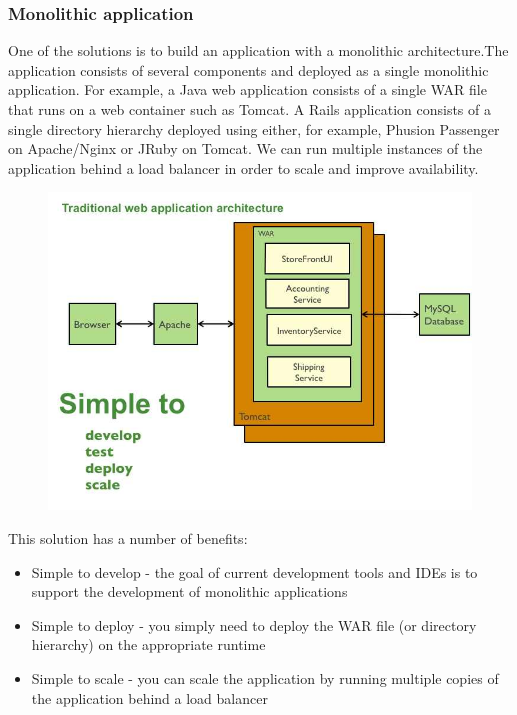 \subsubsection{Monolithic application}
\label{subsec:subsec01}
One of the solutions is to build an application with a monolithic architecture.The application consists of several components and deployed as a single 
monolithic application. For example, a Java web application consists of a single WAR file that runs on a web container such as Tomcat.
  A Rails application consists of a single directory hierarchy deployed using either, for example, Phusion Passenger on Apache/Nginx or JRuby on Tomcat.
   We can run multiple instances of the application behind a load balancer in order to scale and improve availability.
\begin{figure}[h!]
	\centering
	\includegraphics[height=0.5\textheight]{fig01/monolithic}
	\label{fig:FilialesEtClients}
\end{figure}


This solution has a number of benefits:
\begin{itemize}
  \item Simple to develop - the goal of current development tools and IDEs is to support the development of monolithic applications
  \item Simple to deploy - you simply need to deploy the WAR file (or directory hierarchy) on the appropriate runtime
  \item Simple to scale - you can scale the application by running multiple copies of the application behind a load balancer
\end{itemize}

